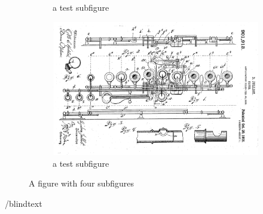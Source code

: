 \begin{figure}
{\begin{subfigure}[b]{.6\textwidth}
			\caption{a test subfigure}
		\end{subfigure}%
		\begin{subfigure}[b]{.6\textwidth}
			\centering
			\includegraphics[width=.95\textwidth]{gfx/06_visual_representation/Julliot_patent.png}
			\caption{a test subfigure}
		\end{subfigure}%
	}
	\caption{A figure with four subfigures}
\end{figure}

/blindtext

